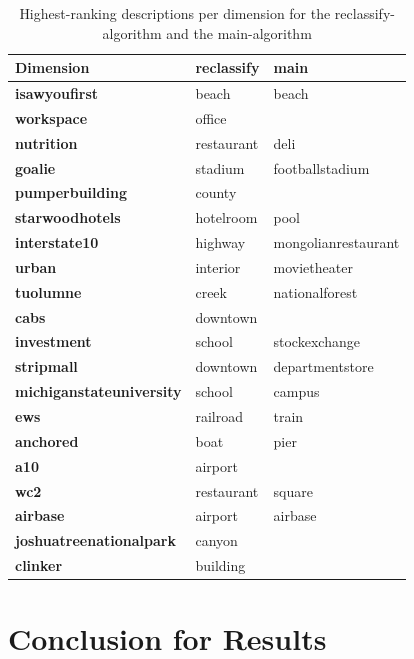 \begin{table}[]
	\centering
	\begin{tabular}{l|ll}
	\textbf{Dimension}               & \textbf{reclassify} & \textbf{main}       \\ \midrule
	\textbf{isawyoufirst}            & beach               & beach               \\
	\textbf{workspace}               & office              &                     \\
	\textbf{nutrition}               & restaurant          & deli                \\
	\textbf{goalie}                  & stadium             & footballstadium     \\
	\textbf{pumperbuilding}          & county              &                     \\
	\textbf{starwoodhotels}          & hotelroom           & pool                \\
	\textbf{interstate10}            & highway             & mongolianrestaurant \\
	\textbf{urban}                   & interior            & movietheater        \\
	\textbf{tuolumne}                & creek               & nationalforest      \\
	\textbf{cabs}                    & downtown            &                     \\
	\textbf{investment}              & school              & stockexchange       \\
	\textbf{stripmall}               & downtown            & departmentstore     \\
	\textbf{michiganstateuniversity} & school              & campus              \\
	\textbf{ews}                     & railroad            & train               \\
	\textbf{anchored}                & boat                & pier                \\
	\textbf{a10}                     & airport             &                     \\
	\textbf{wc2}                     & restaurant          & square              \\
	\textbf{airbase}                 & airport             & airbase             \\
	\textbf{joshuatreenationalpark}  & canyon              &                     \\
	\textbf{clinker}                 & building            &                    
	\end{tabular}
	\caption{Highest-ranking descriptions per dimension for the reclassify-algorithm and the main-algorithm}
	\label{tab:text_per_dim}
\end{table}


\section{Conclusion for Results}

